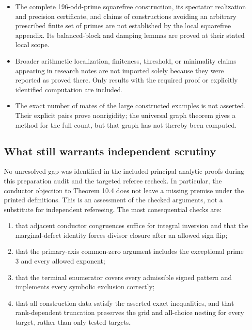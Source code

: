 \documentclass[10pt]{article}
\begin{document}
\begin{itemize}
\item The complete 196-odd-prime squarefree construction, its spectator realization and precision certificate, and claims of constructions avoiding an arbitrary prescribed finite set of primes are not established by the local squarefree appendix. Its balanced-block and damping lemmas are proved at their stated local scope.
\item Broader arithmetic localization, finiteness, threshold, or minimality claims appearing in research notes are not imported solely because they were reported as proved there. Only results with the required proof or explicitly identified computation are included.
\item The exact number of mates of the large constructed examples is not asserted. Their explicit pairs prove nonrigidity; the universal graph theorem gives a method for the full count, but that graph has not thereby been computed.
\end{itemize}

\subsection*{What still warrants independent scrutiny}

No unresolved gap was identified in the included principal analytic proofs during this preparation audit and the targeted referee recheck. In particular, the conductor objection to Theorem 10.4 does not leave a missing premise under the printed definitions. This is an assessment of the checked arguments, not a substitute for independent refereeing. The most consequential checks are:
\begin{enumerate}
\item that adjacent conductor congruences suffice for integral inversion and that the marginal-defect identity forces divisor closure after an allowed sign flip;
\item that the primary-axis common-zero argument includes the exceptional prime $3$ and every allowed exponent;
\item that the terminal enumerator covers every admissible signed pattern and implements every symbolic exclusion correctly;
\item that all construction data satisfy the asserted exact inequalities, and that rank-dependent truncation preserves the grid and all-choice nesting for every target, rather than only tested targets.
\end{enumerate}
\end{document}
